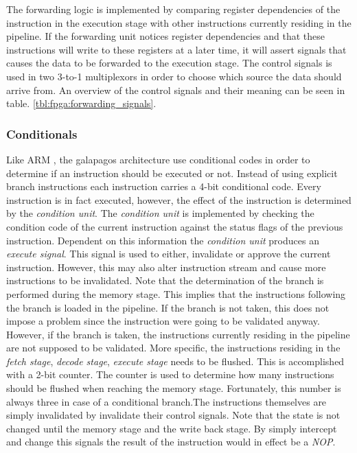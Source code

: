 The forwarding logic is implemented by comparing register dependencies of the instruction in the execution stage with other instructions currently residing in the pipeline. If the forwarding unit notices register dependencies and that these instructions will write to these registers at a later time, it will assert signals that causes the data to be forwarded to the execution stage. The control signals is used in two 3-to-1 multiplexors in order to choose which source the data should arrive from. An overview of the control signals and their meaning can be seen in table. \ref{tbl:fpga:forwarding_signals}.







\subsubsection{Conditionals} 
Like ARM , the galapagos architecture use conditional codes in order to determine if an instruction should be executed or not. Instead of using explicit branch instructions each instruction carries a 4-bit conditional code. Every instruction is in fact executed, however, the effect of the instruction is determined by the \emph{condition unit}. The \emph{condition unit} is implemented by checking the condition code of the current instruction against the status flags of the previous instruction. Dependent on this information the \emph{condition unit} produces an \emph{execute signal}. This signal is used to either, invalidate or approve the current instruction. However, this may also alter instruction stream and cause more instructions to be invalidated. Note that the determination of the branch is performed during the memory stage. This implies that the instructions following the branch is loaded in the pipeline. If the branch is not taken, this does not impose a problem since the instruction were going to be validated anyway. However, if the branch is taken, the instructions currently residing in the pipeline are not supposed to be validated. More specific, the instructions residing in the \emph{fetch stage}, \emph{decode stage}, \emph{execute stage} needs to be flushed.  This is accomplished with a 2-bit counter. The counter is used to determine how many instructions should be flushed when reaching the memory stage. Fortunately, this number is always three in case of a conditional branch.The instructions themselves are simply invalidated by invalidate their control signals. Note that the state is not changed until the memory stage and the write back stage. By simply intercept and change this signals the result of the instruction would in effect be a \emph{NOP}. 


